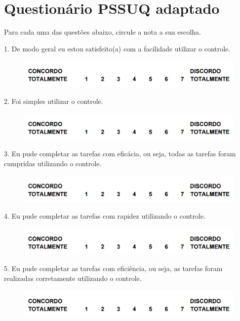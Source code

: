 \chapter{Questionário PSSUQ adaptado}
\label{a.apendice2}
\begin{flushleft}
Para cada uma das questões abaixo, circule a nota a sua escolha.

1. De modo geral eu estou satisfeito(a) com a facilidade utilizar o controle.
\begin{figure}[H]	
	\centering
	\includegraphics[scale=0.6]{Imagens/questionarios.png}
	\label{f.questionarios}
\end{figure}

2. Foi simples utilizar o controle. 
\begin{figure}[H]	
	\centering
	\includegraphics[scale=0.6]{Imagens/questionarios.png}
	\label{f.questionarios}
\end{figure}

3. Eu pude completar as tarefas com eficácia, ou seja, todas as tarefas foram cumpridas utilizando o controle.
\begin{figure}[H]	
	\centering
	\includegraphics[scale=0.6]{Imagens/questionarios.png}
	\label{f.questionarios}
\end{figure}

4. Eu pude completar as tarefas com rapidez utilizando o controle.
\begin{figure}[H]	
	\centering
	\includegraphics[scale=0.6]{Imagens/questionarios.png}
	\label{f.questionarios}
\end{figure}

5. Eu pude completar as tarefas com eficiência, ou seja, as tarefas foram realizadas corretamente utilizando o controle.
\begin{figure}[H]	
	\centering
	\includegraphics[scale=0.6]{Imagens/questionarios.png}
	\label{f.questionarios}
\end{figure}


\end{flushleft}
